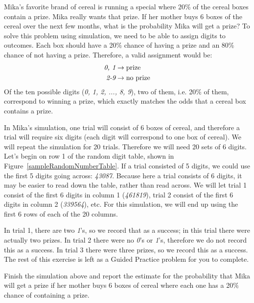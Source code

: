 \D{\newpage}

\begin{examplewrap}
\begin{nexample}{Mika's favorite brand of cereal is running a special where 20\% of the cereal boxes contain a prize. Mika really wants that prize. If her mother buys 6 boxes of the cereal over the next few months, what is the probability Mika will get a prize?}
To solve this problem using simulation, we need to be able to assign digits to outcomes. Each box should have a 20\% chance of having a prize and an 80\% chance of not having a prize. Therefore, a valid assignment would be:
\begin{align*}
\emph{0, 1} &\rightarrow \text{prize}\\
\emph{2-9} &\rightarrow \text{no prize}
\end{align*}
Of the ten possible digits (\emph{0, 1, 2, ..., 8, 9}), two of them, i.e. 20\% of them, correspond to winning a prize, which exactly matches the odds that a cereal box contains a prize.

In Mika's simulation, one trial will consist of 6 boxes of cereal, and therefore a trial will require six digits (each digit will correspond to one box of cereal). We will repeat the simulation for 20 trials. Therefore we will need 20 sets of 6 digits. Let's begin on row 1 of the random digit table, shown in Figure~\ref{sampleRandomNumberTable}. If a trial consisted of 5 digits, we could use the first 5 digits going across: \emph{43087}. Because here a trial consists of 6 digits, it may be easier to read down the table, rather than read across. We will let trial 1 consist of the first 6 digits in column 1 (\emph{461819}), trial 2 consist of the first 6 digits in column 2 (\emph{339564}), etc. For this simulation, we will end up using the first 6 rows of each of the 20 columns. 

In trial 1, there are two \emph{1}'s, so we record that as a success; in this trial there were actually two prizes. In trial 2 there were no \emph{0}'s or \emph{1}'s, therefore we do not record this as a success. In trial 3 there were three prizes, so we record this as a success. The rest of this exercise is left as a Guided Practice problem for you to complete.
\end{nexample}
\end{examplewrap}



\begin{exercisewrap}
\begin{nexercise}Finish the simulation above and report the estimate for the probability that Mika will get a prize if her mother buys 6 boxes of cereal where each one has a 20\% chance of containing a prize.\footnotemark
\end{nexercise}
\end{exercisewrap}

